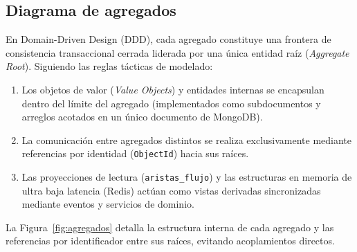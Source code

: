 \documentclass[11pt,a4paper]{article}
\begin{document}
	\subsection{Diagrama de agregados}
	En Domain-Driven Design (DDD), cada agregado constituye una frontera de consistencia transaccional cerrada liderada por una única entidad raíz (\textit{Aggregate Root}). Siguiendo las reglas tácticas de modelado:
	\begin{enumerate}[leftmargin=2em]
		\item Los objetos de valor (\textit{Value Objects}) y entidades internas se encapsulan dentro del límite del agregado (implementados como subdocumentos y arreglos acotados en un único documento de MongoDB).
		\item La comunicación entre agregados distintos se realiza exclusivamente mediante referencias por identidad (\texttt{ObjectId}) hacia sus raíces.
		\item Las proyecciones de lectura (\texttt{aristas\_flujo}) y las estructuras en memoria de ultra baja latencia (Redis) actúan como vistas derivadas sincronizadas mediante eventos y servicios de dominio.
	\end{enumerate}
	
	La Figura~\ref{fig:agregados} detalla la estructura interna de cada agregado y las referencias por identificador entre sus raíces, evitando acoplamientos directos.
	
\end{document}

